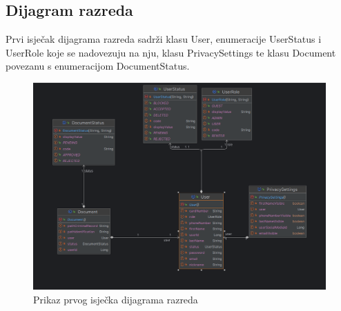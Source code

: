 \subsection{Dijagram razreda}

Prvi isječak dijagrama razreda sadrži klasu User, enumeracije UserStatus i UserRole koje se nadovezuju na nju, klasu PrivacySettings te klasu Document povezanu s enumeracijom DocumentStatus.
\begin{figure} [H]

	\includegraphics[width=1\linewidth]{slike/ClassDiagram1a.png}
	\centering
	\caption{Prikaz prvog isječka dijagrama razreda}
	\label{fig:Prikaz prvog isječka dijagrama razreda}
\end{figure}

